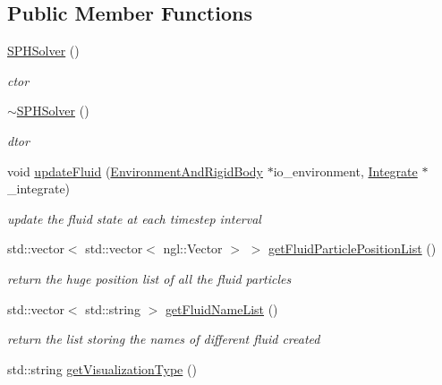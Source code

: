 \subsection*{Public Member Functions}
\begin{DoxyCompactItemize}
\item 
\hyperlink{class_s_p_h_solver_abe3a0bdf9c42b4213944bc0332020e65}{SPHSolver} ()
\begin{DoxyCompactList}\small\item\em ctor \item\end{DoxyCompactList}\item 
\hyperlink{class_s_p_h_solver_a81a0ee1c05b649912faa1e9839f71883}{$\sim$SPHSolver} ()
\begin{DoxyCompactList}\small\item\em dtor \item\end{DoxyCompactList}\item 
void \hyperlink{class_s_p_h_solver_a38ef1e0f18763b28118e3be3a8ba7d08}{updateFluid} (\hyperlink{class_environment_and_rigid_body}{EnvironmentAndRigidBody} $\ast$io\_\-environment, \hyperlink{class_integrate}{Integrate} $\ast$\_\-integrate)
\begin{DoxyCompactList}\small\item\em update the fluid state at each timestep interval \item\end{DoxyCompactList}\item 
std::vector$<$ std::vector$<$ ngl::Vector $>$ $>$ \hyperlink{class_s_p_h_solver_ab8ad27fc25e030d731e249ccfd2efd20}{getFluidParticlePositionList} ()
\begin{DoxyCompactList}\small\item\em return the huge position list of all the fluid particles \item\end{DoxyCompactList}\item 
std::vector$<$ std::string $>$ \hyperlink{class_s_p_h_solver_aa73e68cd39ecbc3e0c868315b1699fcb}{getFluidNameList} ()
\begin{DoxyCompactList}\small\item\em return the list storing the names of different fluid created \item\end{DoxyCompactList}\item 
std::string \hyperlink{class_s_p_h_solver_adcadefbe7d620b8782065a8899bc8040}{getVisualizationType} ()

\end{DoxyCompactItemize}
